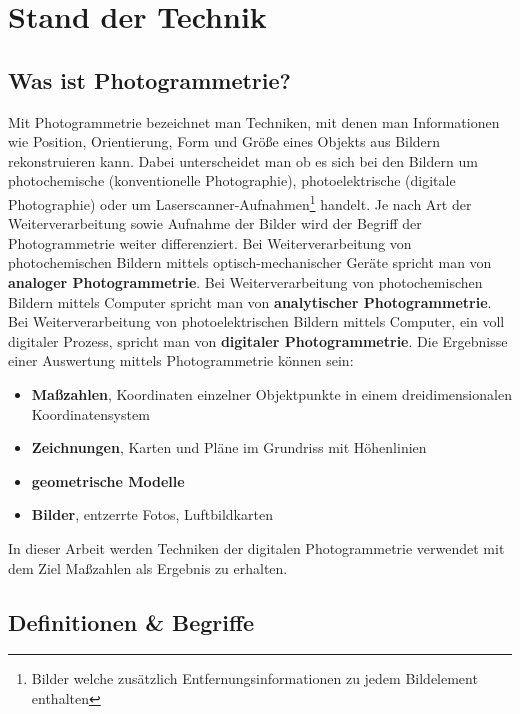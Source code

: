
\chapter{Stand der Technik}

\section{Was ist Photogrammetrie?}\label{sec:what-is-photogrammetry}
Mit Photogrammetrie bezeichnet man Techniken, mit denen man Informationen wie Position, Orientierung, Form und Größe eines Objekts aus Bildern rekonstruieren kann.
Dabei unterscheidet man ob es sich bei den Bildern um photochemische (konventionelle Photographie), photoelektrische (digitale Photographie) oder um Laserscanner-Aufnahmen\footnote{Bilder welche zusätzlich Entfernungsinformationen zu jedem Bildelement enthalten} handelt.
Je nach Art der Weiterverarbeitung sowie Aufnahme der Bilder wird der Begriff der Photogrammetrie weiter differenziert.
Bei Weiterverarbeitung von photochemischen Bildern mittels optisch-mechanischer Geräte spricht man von \textbf{analoger Photogrammetrie}.
Bei Weiterverarbeitung von photochemischen Bildern mittels Computer spricht man von \textbf{analytischer Photogrammetrie}.
Bei Weiterverarbeitung von photoelektrischen Bildern mittels Computer, ein voll digitaler Prozess, spricht man von \textbf{digitaler Photogrammetrie}.
Die Ergebnisse einer Auswertung mittels Photogrammetrie können sein: \cite[Kapitel 1.1]{kraus_2004}
\begin{itemize}
\item \textbf{Maßzahlen}, Koordinaten einzelner Objektpunkte in einem dreidimensionalen Koordinatensystem
\item \textbf{Zeichnungen}, Karten und Pläne im Grundriss mit Höhenlinien
\item \textbf{geometrische Modelle}
\item \textbf{Bilder}, entzerrte Fotos, Luftbildkarten
\end{itemize}

In dieser Arbeit werden Techniken der digitalen Photogrammetrie verwendet mit dem Ziel Maßzahlen als Ergebnis zu erhalten.

\section{Definitionen \& Begriffe}

